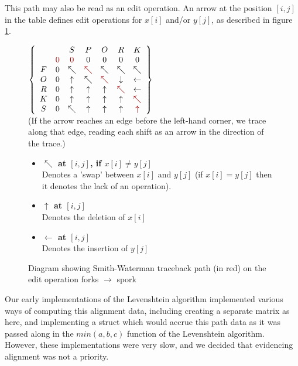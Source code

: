 This path may also be read as an edit operation. An arrow at the
position $[i,j]$ in the table defines edit operations for $x[i]$
and/or $y[j]$, as described in figure
\ref{fig:smith-waterman-traceback}.

\begin{figure}[h]
  \centering 
  $\left\{
  \begin{array}{ccccccc}
    & & S & P & O & R & K \\ & \color{red}{0} & \color{red}{0} & 0 & 0
    & 0 & 0 \\ F & 0 & \nwarrow & \color{red}{\nwarrow} & \nwarrow &
    \nwarrow & \nwarrow \\ O & 0 & \uparrow & \nwarrow &
    \color{red}{\nwarrow} & \downarrow & \leftarrow \\ R & 0 &
    \uparrow & \uparrow & \uparrow & \color{red}{\nwarrow} &
    \leftarrow \\ K & 0 & \uparrow & \uparrow & \uparrow & \uparrow &
    \color{red}{\nwarrow} \\ S & 0 & \nwarrow & \uparrow & \uparrow &
    \uparrow & \color{red}{\uparrow} \\
  \end{array}\right\} $\\
  \vspace{2mm}
  (If the arrow reaches an edge before the left-hand corner, we trace
  along that edge, reading each shift as an arrow in the direction of
  the trace.)
  \vspace{5mm}
  \begin{itemize}
  \item \textbf{$\nwarrow$ at $[i,j]$, if $x[i] \neq y[j]$} \\ Denotes a
    'swap' between $x[i]$ and $y[j]$ (if $x[i] = y[j]$ then it denotes
    the lack of an operation).
  \item \textbf{$\uparrow$ at $[i,j]$}\\Denotes the deletion of $x[i]$
  \item \textbf{$\leftarrow$ at $[i,j]$}\\Denotes the insertion of
    $y[j]$
  \end{itemize}
  \vspace{5mm}
  \caption{Diagram showing Smith-Waterman traceback path (in red) on
    the edit operation forks $\rightarrow$ spork}
  \label{fig:smith-waterman-traceback}
\end{figure}

Our early implementations of the Levenshtein algorithm implemented
various ways of computing this alignment data, including creating a
separate matrix as here, and implementing a struct which would accrue
this path data as it was passed along in the $min(a,b,c)$ function of
the Levenshtein algorithm. However, these implementations were very
slow, and we decided that evidencing alignment was not a priority. 

